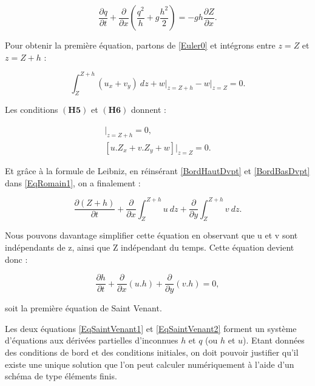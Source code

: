 \documentclass[
11pt, %
francais, %
singlespacing, %
headsepline, %
]{MastersDoctoralThesis} %
\theoremstyle{definition}
\begin{document}
\begin{equation}
\frac{\partial q}{\partial t}+\frac{\partial}{\partial x}(\frac{q^{2}}{h}+g\frac{h^{2}}{2})=-g h\frac{\partial Z}{\partial x}. \label{EqSaintVenant2}
\end{equation}


Pour obtenir la première équation, partons de \ref{Euler0} et intégrons entre $z=Z$ et $z=Z+h$ :

\begin{equation}
\int_{Z}^{Z+h} (u_x + v_y) \ dz + w\vert_{z=Z+h}-w\vert_{z=Z} = 0.
\label{EqRomain1}
\end{equation}

Les conditions $(\textbf{H5})$ et  $(\textbf{H6})$ donnent :

\begin{align}
[ \frac{\partial (Z+h)}{\partial t} + u.\frac{\partial (Z+h)}{\partial x} + v.\frac{\partial (Z+h)}{\partial y} - w ] \vert _{z=Z+h} = 0 \label{BordHautDvpt}, \\
[ u.Z_x + v.Z_y + w ] \vert _{z=Z} = 0. \label{BordBasDvpt}
\end{align}

Et grâce à la formule de Leibniz, en réinsérant \ref{BordHautDvpt} et \ref{BordBasDvpt} dans \ref{EqRomain1}, on a finalement : 

\begin{equation}
\frac{\partial (Z+h)}{\partial t} + \frac{\partial}{\partial x} \int_{Z}^{Z+h} u \ dz +  \frac{\partial}{\partial y} \int_{Z}^{Z+h} v \ dz.
\end{equation}

Nous pouvons davantage simplifier cette équation en observant que u et v sont indépendants de z, ainsi que Z indépendant du temps. Cette équation devient donc :

\begin{equation}
\frac{\partial h}{\partial t} + \frac{\partial}{\partial x} (u . h ) + \frac{\partial}{\partial y} (v . h )=0,\label{EqSaintVenant1}
\end{equation}

soit la première équation de Saint Venant.

Les deux équations \ref{EqSaintVenant1} et \ref{EqSaintVenant2} forment un système d'équations aux dérivées partielles d'inconnues $h$ et $q$ (ou $h$ et $u$). Etant données des conditions de bord et des conditions initiales, on doit pouvoir justifier qu'il existe une unique solution que l'on peut calculer numériquement à l'aide d'un schéma de type éléments finis.
\end{document}
